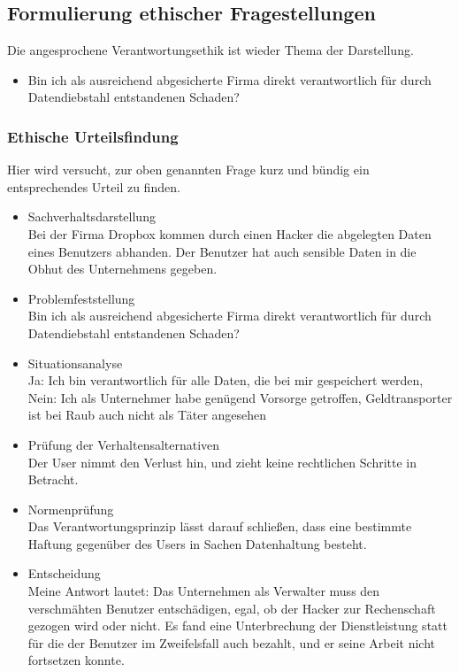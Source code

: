 \documentclass[letterpaper, 12pt]{article}
\let\tempsubsection\subsection
\renewcommand\subsection[1]{\vspace{0cm}\tempsubsection{#1}\vspace{0cm}}
\let\tempsubsubsection\subsubsection
\renewcommand\subsubsection[1]{\vspace{0cm}\tempsubsubsection{#1}\vspace{0cm}}
\begin{document}
\subsection{Formulierung ethischer Fragestellungen}

Die angesprochene Verantwortungsethik ist wieder Thema der Darstellung.

\begin{itemize}
	\item Bin ich als ausreichend abgesicherte Firma direkt verantwortlich für durch Datendiebstahl
entstandenen Schaden?
\end{itemize}

\subsubsection{Ethische Urteilsfindung}

Hier wird versucht, zur oben genannten Frage kurz und bündig ein entsprechendes Urteil zu finden.

\begin{itemize}
	\item Sachverhaltsdarstellung \\
	Bei der Firma Dropbox kommen durch einen Hacker die abgelegten Daten eines Benutzers abhanden. Der Benutzer hat auch sensible Daten in die Obhut des Unternehmens gegeben.
	\item Problemfeststellung \\
	Bin ich als ausreichend abgesicherte Firma direkt verantwortlich für durch Datendiebstahl
entstandenen Schaden?
	\item Situationsanalyse \\
	Ja: Ich bin verantwortlich für alle Daten, die bei mir gespeichert werden, Nein: Ich als Unternehmer habe genügend Vorsorge getroffen, Geldtransporter ist bei Raub auch nicht als Täter angesehen
	\item Prüfung der Verhaltensalternativen \\
	Der User nimmt den Verlust hin, und zieht keine rechtlichen Schritte in Betracht.
	\item Normenprüfung \\
	Das Verantwortungsprinzip lässt darauf schließen, dass eine bestimmte Haftung gegenüber des Users in Sachen Datenhaltung besteht. 
	\item Entscheidung \\
	Meine Antwort lautet: Das Unternehmen als Verwalter muss den verschmähten Benutzer entschädigen, egal, ob der Hacker zur Rechenschaft gezogen wird oder nicht. Es fand eine Unterbrechung der Dienstleistung statt für die der Benutzer im Zweifelsfall auch bezahlt, und er seine Arbeit nicht fortsetzen konnte.
\end{itemize}

\clearpage



\end{document}
